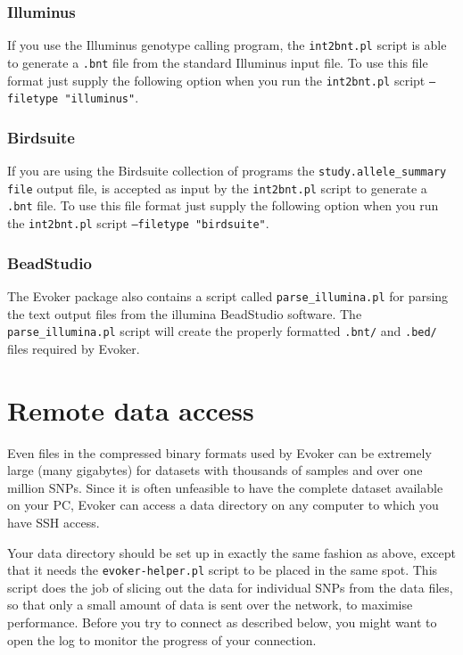 \documentclass{article}
\begin{document}
\subsubsection{Illuminus}
If you use the Illuminus genotype calling program, the \texttt{int2bnt.pl} script is able to generate a \texttt{.bnt} file from the standard Illuminus input file. To use this file format just supply the following option when you run the \texttt{int2bnt.pl} script \texttt{--filetype "illuminus"}.

\subsubsection{Birdsuite}
If you are using the Birdsuite collection of programs the \texttt{study.allele\_summary file} output file, is accepted as input by the \texttt{int2bnt.pl} script to generate a \texttt{.bnt} file. To use this file format just supply the following option when you run the \texttt{int2bnt.pl} script \texttt{--filetype "birdsuite"}.

\subsubsection{BeadStudio}
The Evoker package also contains a script called \texttt{parse\_illumina.pl} for parsing the text output files from the illumina BeadStudio software. The \texttt{parse\_illumina.pl} script will create the properly formatted \texttt{.bnt/} and \texttt{.bed/} files required by Evoker. 

\section{Remote data access}

Even files in the compressed binary formats used by Evoker can be extremely large (many gigabytes) for datasets with thousands of samples and over one million SNPs. Since it is often unfeasible to have the complete dataset available on your PC, Evoker can access a data directory on any computer to which you have SSH access.

Your data directory should be set up in exactly the same fashion as above, except that it needs the \texttt{evoker-helper.pl} script to be placed in the same spot. This script does the job of slicing out the data for individual SNPs from the data files, so that only a small amount of data is sent over the network, to maximise performance. Before you try to connect as described below, you might want to open the log to monitor the progress of your connection.
\end{document}
